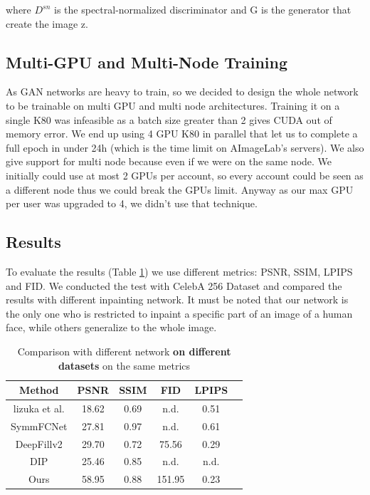 \documentclass[10pt,twocolumn,letterpaper]{article}
\begin{document}
where \(D^{sn}\) is the spectral-normalized discriminator and G is the generator
that create the image z.

\subsection{Multi-GPU and Multi-Node Training}
As GAN networks are heavy to train, so we decided to design the whole network to be
trainable on multi GPU and multi node architectures. Training it on a single K80
was infeasible as a batch size greater than 2 gives CUDA out of memory error.
We end up using 4 GPU K80 in parallel that let us to complete a full epoch in
under 24h (which is the time limit on AImageLab's servers). We also give support
for multi node because even if we were on the same node. We initially could use
at most 2 GPUs per account, so every account could be seen as a different node
thus we could break the GPUs limit. Anyway as our max GPU per user was
upgraded to 4, we didn't use that technique.

\subsection{Results}
To evaluate the results (Table \ref{tab:results}) we use different metrics:
PSNR, SSIM, LPIPS and FID. We conducted the test with CelebA 256 Dataset and
compared the results with different inpainting network. It must be noted that
our network is the only one who is restricted to inpaint a specific part of an
image of a human face, while others generalize to the whole image.
\begin{table}
  \begin{tabular}{|c|c|c|c|c|c|}
    \hline
    Method & PSNR & SSIM & FID & LPIPS \\
    \hline
    lizuka et al. \cite{iizuka2017globally} & 18.62 & 0.69 & n.d. & 0.51 \\
    SymmFCNet \cite{li2020learning}         & 27.81 & 0.97 & n.d. & 0.61 \\
    DeepFillv2 \cite{yu2019free}            & 29.70 & 0.72 & 75.56 & 0.29 \\
    DIP \cite{Ulyanov_2018_CVPR}            & 25.46 & 0.85 & n.d. & n.d. \\
    Ours                                    & 58.95 & 0.88 & 151.95 & 0.23\\
  \hline
  \end{tabular}
  \\
  \caption{Comparison with different network \textbf{on different datasets} on the same metrics}
  \label{tab:results}
\end{table}
\end{document}
